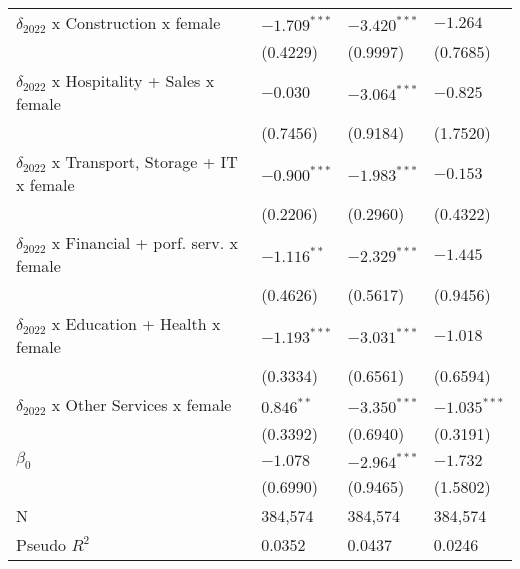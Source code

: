 \begin{tabular}{llll}
$\delta_{2022}$ x Construction x female            &     $-1.709^{***}$ &     $-3.420^{***}$ &           $-1.264$ \\
                                                   &           (0.4229) &           (0.9997) &           (0.7685) \\
$\delta_{2022}$ x Hospitality + Sales x female     &           $-0.030$ &     $-3.064^{***}$ &           $-0.825$ \\
                                                   &           (0.7456) &           (0.9184) &           (1.7520) \\
$\delta_{2022}$ x Transport, Storage + IT x female &     $-0.900^{***}$ &     $-1.983^{***}$ &           $-0.153$ \\
                                                   &           (0.2206) &           (0.2960) &           (0.4322) \\
$\delta_{2022}$ x Financial + porf. serv. x female &      $-1.116^{**}$ &     $-2.329^{***}$ &           $-1.445$ \\
                                                   &           (0.4626) &           (0.5617) &           (0.9456) \\
$\delta_{2022}$ x Education + Health x female      &     $-1.193^{***}$ &     $-3.031^{***}$ &           $-1.018$ \\
                                                   &           (0.3334) &           (0.6561) &           (0.6594) \\
$\delta_{2022}$ x Other Services x female          &       $0.846^{**}$ &     $-3.350^{***}$ &     $-1.035^{***}$ \\
                                                   &           (0.3392) &           (0.6940) &           (0.3191) \\
$\beta_0$                                          &           $-1.078$ &     $-2.964^{***}$ &           $-1.732$ \\
                                                   &           (0.6990) &           (0.9465) &           (1.5802) \\
N                                                  &            384,574 &            384,574 &            384,574 \\
Pseudo $R^2$                                       &             0.0352 &             0.0437 &             0.0246 \\
\bottomrule
\end{tabular}

